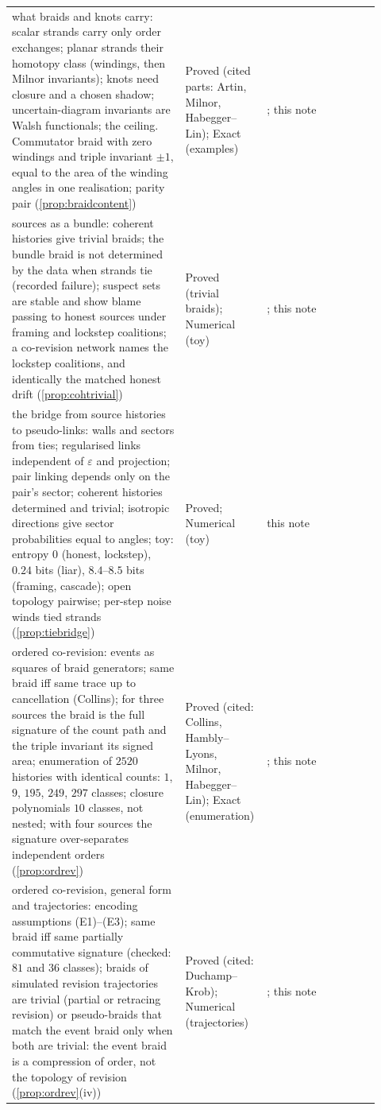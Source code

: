\documentclass[11pt]{article}
\theoremstyle{definition}\newtheorem{definition}[theorem]{Definition}\newtheorem{remark}[theorem]{Remark}\newtheorem{example}[theorem]{Example}\newtheorem{problem}[theorem]{Open problem}\crefname{problem}{Problem}{Problems}
\begin{document}
{\begin{longtable}{p{0.46\linewidth}p{0.16\linewidth}p{0.3\linewidth}}
\rowcolor{stNew} what braids and knots carry: scalar strands carry only order exchanges; planar strands their homotopy class (windings, then Milnor invariants); knots need closure and a chosen shadow; uncertain-diagram invariants are Walsh functionals; the ceiling. Commutator braid with zero windings and triple invariant $\pm1$, equal to the area of the winding angles in one realisation; parity pair (\cref{prop:braidcontent}) & Proved (cited parts: Artin, Milnor, Habegger--Lin); Exact (examples) & \cite{Artin1947,Birman1974,Milnor1954,HabeggerLin1990,Chen1977,Kohno1985}; this note\\
\rowcolor{stNew} sources as a bundle: coherent histories give trivial braids; the bundle braid is not determined by the data when strands tie (recorded failure); suspect sets are stable and show blame passing to honest sources under framing and lockstep coalitions; a co-revision network names the lockstep coalitions, and identically the matched honest drift (\cref{prop:cohtrivial}) & Proved (trivial braids); Numerical (toy) & \cite{AbramskyCaru2019,Iannucci2025}; this note\\
\rowcolor{stNew} the bridge from source histories to pseudo-links: walls and sectors from ties; regularised links independent of $\varepsilon$ and projection; pair linking depends only on the pair's sector; coherent histories determined and trivial; isotropic directions give sector probabilities equal to angles; toy: entropy $0$ (honest, lockstep), $0.24$ bits (liar), $8.4$--$8.5$ bits (framing, cascade); open topology pairwise; per-step noise winds tied strands (\cref{prop:tiebridge}) & Proved; Numerical (toy) & this note\\
\rowcolor{stNew} ordered co-revision: events as squares of braid generators; same braid iff same trace up to cancellation (Collins); for three sources the braid is the full signature of the count path and the triple invariant its signed area; enumeration of $2520$ histories with identical counts: $1$, $9$, $195$, $249$, $297$ classes; closure polynomials $10$ classes, not nested; with four sources the signature over-separates independent orders (\cref{prop:ordrev}) & Proved (cited: Collins, Hambly--Lyons, Milnor, Habegger--Lin); Exact (enumeration) & \cite{Collins1994,HamblyLyons2010,CartierFoata1969}; this note\\
\rowcolor{stNew} ordered co-revision, general form and trajectories: encoding assumptions (E1)--(E3); same braid iff same partially commutative signature (checked: $81$ and $36$ classes); braids of simulated revision trajectories are trivial (partial or retracing revision) or pseudo-braids that match the event braid only when both are trivial: the event braid is a compression of order, not the topology of revision (\cref{prop:ordrev}(iv)) & Proved (cited: Duchamp--Krob); Numerical (trajectories) & \cite{DuchampKrob1992}; this note\\

\end{longtable}}
\end{document}
